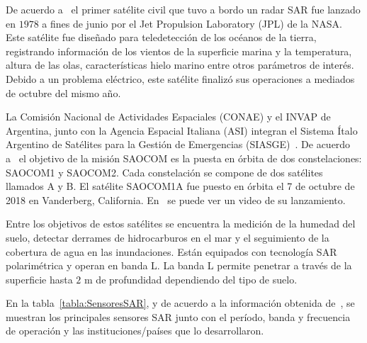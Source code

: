 De acuerdo a~\citet{Seasat} el primer satélite civil que tuvo a bordo un radar SAR fue lanzado en $1978$ a fines de junio por el Jet Propulsion Laboratory (JPL) de la NASA. Este satélite fue diseñado para teledetección de los océanos de la tierra, registrando información de los vientos de la superficie marina y la temperatura, altura de las olas, características hielo marino entre otros parámetros de interés. Debido a un problema eléctrico, este satélite finalizó sus operaciones a mediados de octubre del mismo año.


La Comisión Nacional de Actividades Espaciales (CONAE) y el INVAP de Argentina, junto con la Agencia Espacial Italiana (ASI) integran el Sistema Ítalo Argentino de Satélites para la Gestión de Emergencias (SIASGE)~\citet{Invap}. De acuerdo a~\citet{Saocom} el objetivo de la misión SAOCOM es la puesta en órbita de dos constelaciones: SAOCOM1 y SAOCOM2. Cada constelación se compone de dos satélites llamados A y B. El satélite SAOCOM1A fue puesto en órbita el 7 de octubre de 2018 en Vanderberg, California. En~\citet{Saocom} se puede ver un video de su lanzamiento.

Entre los objetivos de estos satélites se encuentra la medición de la humedad del suelo, detectar derrames de hidrocarburos en el mar y el seguimiento de la cobertura de agua en las inundaciones. Están equipados con tecnología SAR polarimétrica y operan en banda L. La banda L permite penetrar a través de la superficie hasta $2$ m de profundidad dependiendo del tipo de suelo. 

En la tabla~\ref{tabla:SensoresSAR}, y de acuerdo a la información obtenida de~\citet{Moreira2013}, se muestran los principales sensores SAR junto con el período, banda y frecuencia de operación y las instituciones/países que lo desarrollaron. 

